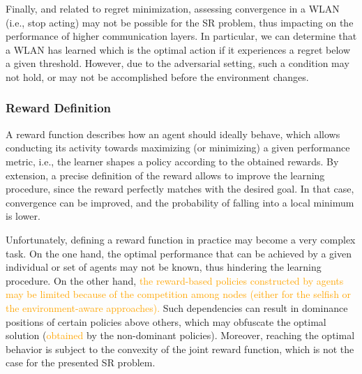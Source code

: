 \documentclass[preprint,12pt]{elsarticle}
\begin{document}
Finally, and related to regret minimization, assessing convergence in a WLAN (i.e., stop acting) may not be possible for the SR problem, thus impacting on the performance of higher communication layers. In particular, we can determine that a WLAN has learned which is the optimal action if it experiences a regret below a given threshold. However, due to the adversarial setting, such a condition may not hold, or may not be accomplished before the environment changes. 

\subsubsection{Reward Definition}
\label{subsubsection:reward}
A reward function describes how an agent should ideally behave, which allows conducting its activity towards maximizing (or minimizing) a given performance metric, i.e., the learner shapes a policy according to the obtained rewards. By extension, a precise definition of the reward allows to improve the learning procedure, since the reward perfectly matches with the desired goal. In that case, convergence can be improved, and the probability of falling into a local minimum is lower. 

Unfortunately, defining a reward function in practice may become a very complex task. On the one hand, the optimal performance that can be achieved by a given individual or set of agents may not be known, thus hindering the learning procedure. On the other hand, \textcolor{orange}{the reward-based policies constructed by agents may be limited because of the competition among nodes (either for the selfish or the environment-aware approaches).} Such dependencies can result in dominance positions of certain policies above others, which may obfuscate the optimal solution (\textcolor{orange}{obtained} by the non-dominant policies). Moreover, reaching the optimal behavior is subject to the convexity of the joint reward function, which is not the case for the presented SR problem.
\end{document}
